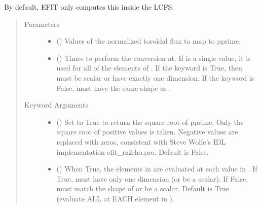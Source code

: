 \documentclass[letterpaper,10pt,english]{sphinxmanual}
\begin{document}
\begin{fulllineitems}
\begin{fulllineitems}
By default, EFIT only computes this inside the LCFS.
\begin{quote}\begin{description}
\item[{Parameters}] \leavevmode\begin{itemize}
\item {} 
 () \textendash{} Values of the normalized
toroidal flux to map to pprime.

\item {} 
 () \textendash{} Times to perform the conversion at.
If  is a single value, it is used for all of the elements of
. If the  keyword is True, then  must be scalar
or have exactly one dimension. If the  keyword is False,
 must have the same shape as .

\end{itemize}

\item[{Keyword Arguments}] \leavevmode\begin{itemize}
\item {} 
 () \textendash{} Set to True to return the square root of pprime.
Only the square root of positive values is taken. Negative
values are replaced with zeros, consistent with Steve Wolfe’s
IDL implementation efit\_rz2rho.pro. Default is False.

\item {} 
 () \textendash{} When True, the elements in  are evaluated
at each value in . If True,  must have only one dimension
(or be a scalar). If False,  must match the shape of 
or be a scalar. Default is True (evaluate ALL  at EACH
element in ).


\end{itemize}
\end{description}
\end{quote}
\end{fulllineitems}
\end{fulllineitems}
\end{document}
